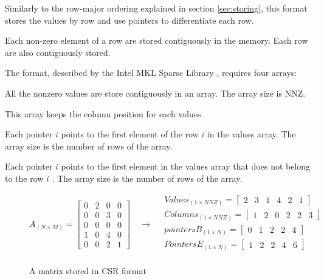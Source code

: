 Similarly to the row-major ordering explained in section \ref{sec:storing}, this format stores the values by row and use pointers to differentiate each row.

Each non-zero element of a row are stored contiguously in the memory. Each row are also contiguously stored.

The format, described by the Intel MKL Sparse Library \cite{mklformat}, requires four arrays:
\begin{description}[leftmargin=!,labelwidth=\widthof{\bfseries Beginning of row pointers}]
	\item [Values] All the nonzero values are store contiguously in an array. The array size is {NNZ}.
	\item [Column pointers] This array keeps the column position for each values.
	\item [Beginning of row pointers] Each pointer $i$ points to the first element of the row $i$ in the values array. The array size is the number of rows of the array.
	\item [End of row pointers]  Each pointer $i$ points to the first element in the values array that does not belong to the row $i$ . The array size is the number of rows of the array.
\end{description}

\begin{figure}
	\[
	A_{(N\times M)} = 
	\begin{bmatrix}
	0 & 2 & 0 & 0\\
	0 & 0 & 3 & 0\\
	0 & 0 & 0 & 0\\
	1 & 0 & 4 & 0\\
	0 & 0 & 2 & 1
	\end{bmatrix}
	\quad\rightarrow\quad
	\begin{aligned}
	Values_{(1\times NNZ)} = 
	\begin{bmatrix}
	2 &  3 & 1 & 4 & 2 & 1
	\end{bmatrix}
	\\
	Columns_{(1\times NNZ)} = 
	\begin{bmatrix}
	1 &  2 & 0 & 2 & 2 & 3
	\end{bmatrix}
	\\
	pointersB_{(1\times N)} = 
	\begin{bmatrix}
	0 & 1 & 2 & 2 & 4 
	\end{bmatrix}
	\\
	PointersE_{(1\times N)} = 
	\begin{bmatrix}
	1 & 2 & 2 & 4 & 6
	\end{bmatrix}
	\\
	\end{aligned}
	\]
	\caption{A matrix stored in CSR format}
		\label{fig:csrformat}
\end{figure}
